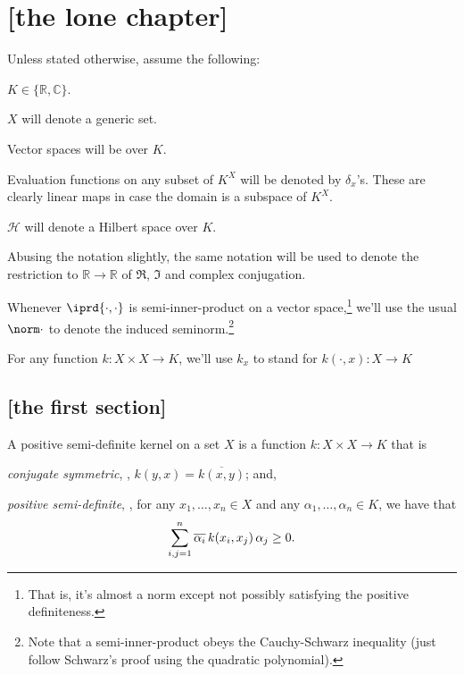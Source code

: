 \chapter{[the lone chapter]}

\begin{conv}
	Unless stated otherwise, assume the following:
	\begin{assmplist}
		\item $K\in\{\mathbb R, \mathbb C\}$.
		
		\item $X$ will denote a generic set.
		
		\item Vector spaces will be over $K$.
		
		\item Evaluation functions on any subset of $K^X$ will be denoted by $\delta_x$'s. These are clearly linear maps in case the domain is a subspace of $K^X$.
		
		\item $\mathscr H$ will denote a Hilbert space over $K$.
		
		\item Abusing the notation slightly, the same notation will be used to denote the restriction to $\mathbb{R\to R}$ of $\Re$, $\Im$ and complex conjugation.
		
		\item Whenever $\iprd{\cdot, \cdot}$ is semi-inner-product on a vector space,\footnote{
			That is, it's almost a norm except not possibly satisfying the positive definiteness.
		} we'll use the usual $\norm\cdot$ to denote the induced seminorm.\footnote{Note that a semi-inner-product obeys the Cauchy-Schwarz inequality (just follow Schwarz's proof using the quadratic polynomial).}
		
		\item For any function $k\colon X\times X\to K$, we'll use $k_x$ to stand for $k(\cdot, x)\colon X\to K$
	\end{assmplist}
\end{conv}

\section{[the first section]}

	\begin{dfn}[p.s.d. kernels]
		A positive semi-definite kernel on a set $X$ is a function $k\colon X\times X\to K$ that is
		\begin{mylist}
			\item \emph{conjugate symmetric}, \ie, $k(y, x) = \overline{k(x, y)}$; and,
			
			\item \emph{positive semi-definite}, \ie, for any $x_1, \ldots, x_n\in X$ and any $\alpha_1, \ldots, \alpha_n\in K$, we have that
			\[
			\sum_{i, j = 1}^n \overline{\alpha_i}\, k(x_i, x_j)\, \alpha_j\ge 0\text.
			\]
		\end{mylist}
	\end{dfn}
	
